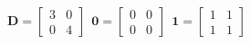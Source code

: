\documentclass[12 pt]{slides}
\begin{document}
\begingroup
\[\textbf{D} = \begin{bmatrix}3 & 0\\0 & 4\end{bmatrix}\ \ \textbf{0} =
	\begin{bmatrix}0 & 0\\0 & 0\end{bmatrix}\ \ \textbf{1} = 
		\begin{bmatrix}1 & 1\\1 & 1\end{bmatrix}\]
\endgroup
\end{document}
